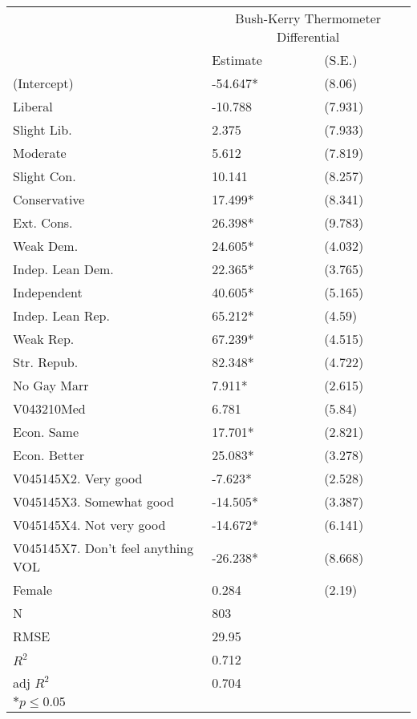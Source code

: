 \begin{tabular}{*{3}{l}}
 \hline
                &\multicolumn{2}{c}{Bush-Kerry Thermometer Differential}   \\
                &Estimate &(S.E.) \\
 \hline
 \hline
  (Intercept)    & -54.647*  &   (8.06) \\
  Liberal        & -10.788  &   (7.931) \\
  Slight Lib.    &  2.375  &   (7.933) \\
  Moderate       &  5.612  &   (7.819) \\
  Slight Con.    &  10.141  &   (8.257) \\
  Conservative   &  17.499*  &   (8.341) \\
  Ext. Cons.     &  26.398*  &   (9.783) \\
  Weak Dem.      &  24.605*  &   (4.032) \\
  Indep. Lean Dem.   &  22.365*  &   (3.765) \\
  Independent    &  40.605*  &   (5.165) \\
  Indep. Lean Rep.   &  65.212*  &   (4.59) \\
  Weak Rep.      &  67.239*  &   (4.515) \\
  Str. Repub.    &  82.348*  &   (4.722) \\
  No Gay Marr    &  7.911*  &   (2.615) \\
  V043210Med     &  6.781  &   (5.84) \\
  Econ. Same     &  17.701*  &   (2.821) \\
  Econ. Better   &  25.083*  &   (3.278) \\
  V045145X2. Very good   & -7.623*  &   (2.528) \\
  V045145X3. Somewhat good   & -14.505*  &   (3.387) \\
  V045145X4. Not very good   & -14.672*  &   (6.141) \\
  V045145X7. Don't feel anything {VOL}   & -26.238*  &   (8.668) \\
  Female         &  0.284  &   (2.19) \\
 \hline 
 N                &803      &       \\
 RMSE            &29.95        & \\
 $R^2$           &0.712        & \\
 adj $R^2$       &0.704        & \\
 \hline
 \hline
 
 \multicolumn{2}{l}{${*}  p \le 0.05$   }\\
 \end{tabular}